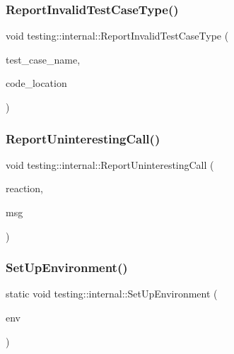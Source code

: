 \mbox{\label{namespacetesting_1_1internal_ab7e343160ee0aca7c8ae7c025a372453}} 
\subsubsection{\texorpdfstring{ReportInvalidTestCaseType()}{ReportInvalidTestCaseType()}}
{\footnotesize\ttfamily void testing\+::internal\+::\+Report\+Invalid\+Test\+Case\+Type (\begin{DoxyParamCaption}\item[{const char $\ast$}]{test\+\_\+case\+\_\+name,  }\item[{\mbox{\hyperlink{structtesting_1_1internal_1_1CodeLocation}{Code\+Location}}}]{code\+\_\+location }\end{DoxyParamCaption})}

\mbox{\label{namespacetesting_1_1internal_af045b703d8487374620a8106a76814ee}} 
\subsubsection{\texorpdfstring{ReportUninterestingCall()}{ReportUninterestingCall()}}
{\footnotesize\ttfamily void testing\+::internal\+::\+Report\+Uninteresting\+Call (\begin{DoxyParamCaption}\item[{Call\+Reaction}]{reaction,  }\item[{const std\+::string \&}]{msg }\end{DoxyParamCaption})}

\mbox{\label{namespacetesting_1_1internal_a5f5535012d4548788a5d1a4e0f18e19e}} 
\subsubsection{\texorpdfstring{SetUpEnvironment()}{SetUpEnvironment()}}
{\footnotesize\ttfamily static void testing\+::internal\+::\+Set\+Up\+Environment (\begin{DoxyParamCaption}\item[{\mbox{\hyperlink{classtesting_1_1Environment}{Environment}} $\ast$}]{env }\end{DoxyParamCaption})\hspace{0.3cm}{\ttfamily [static]}}

